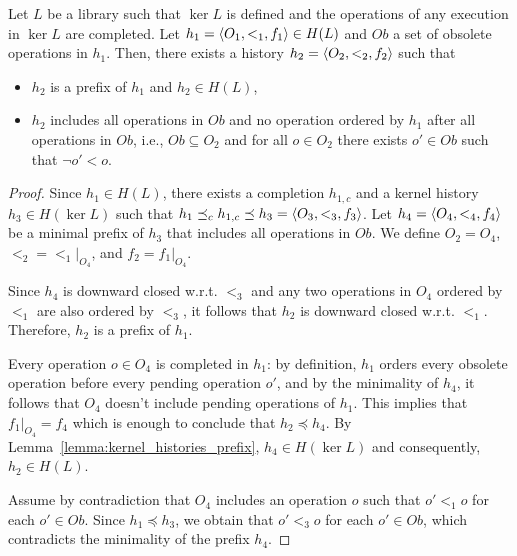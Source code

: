 \begin{lemma}\label{lemma:pref_obsolete}

Let $L$ be a library such that $\ker L$ is defined and the operations of any execution in $\ker L$ are completed.
Let $h_1=\left\langle {O_1,<_1,f_1} \right\rangle\in H(L)$ and $Ob$ a set of obsolete operations in $h_1$. Then, there exists a 
history $h_2=\left\langle {O_2,<_2,f_2} \right\rangle$ such that 

\begin{itemize}

	\item $h_2$ is a prefix of $h_1$ and $h_2\in H(L)$, 

	\item $h_2$ includes all operations in $Ob$ and no operation ordered by $h_1$ after all operations in $Ob$, i.e.,
	$Ob\subseteq O_2$ and for all $o\in O_2$ there exists $o'\in Ob$ such that $\neg o'<o$.
	
\end{itemize}

\end{lemma}

\begin{proof}

Since $h_1\in H(L)$, there exists a completion $h_{1,c}$ and a kernel history $h_3\in H(\ker L)$ such that
$h_1\preceq_c h_{1,c} \preceq h_3=\left\langle {O_3,<_3,f_3} \right\rangle$. Let $h_4=\left\langle {O_4,<_4,f_4} \right\rangle$ be a minimal prefix of $h_3$ that
includes all operations in $Ob$. We define $O_2=O_4$, $<_2=<_1 |_{O_4}$, and $f_2=f_1 |_{O_4}$.

Since $h_4$ is downward closed w.r.t. $<_3$ and any two operations in $O_4$ ordered by $<_1$ are 
also ordered by $<_3$, it follows that $h_2$ is downward closed w.r.t. $<_1$. 
Therefore, $h_2$ is a prefix of $h_1$.

Every operation $o\in O_4$ is completed in $h_1$: by definition, 
$h_1$ orders every obsolete operation before every pending operation $o'$,
and by the minimality of $h_4$, it follows that $O_4$ doesn't include pending operations
of $h_1$. This implies that $f_1 |_{O_4}=f_4$ which is enough to conclude that 
$h_2\preceq h_4$. By Lemma~\ref{lemma:kernel_histories_prefix}, $h_4\in H(\ker L)$ and consequently, 
$h_2\in H(L)$.

Assume by contradiction that $O_4$ includes an operation $o$ such that $o' <_1 o$ for each $o'\in Ob$.
Since $h_1\preceq h_3$, we obtain that $o' <_3 o$ for each $o'\in Ob$, which contradicts the minimality of
the prefix $h_4$.


\end{proof}


